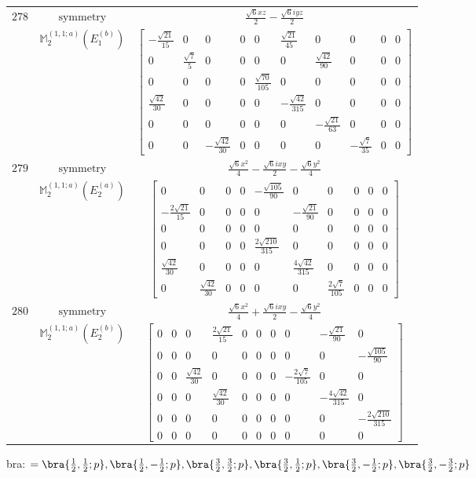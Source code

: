 \documentclass[fleqn,8pt,landscape]{jsarticle}
\begin{document}
\begin{longtable}{ccc}
$ 278 $ & $ \text{symmetry} $ & $ \frac{\sqrt{6} x z}{2} - \frac{\sqrt{6} i y z}{2} $ \\
$  $ & $ \mathbb{M}_{2}^{(1,1;a)}(E_{1}^{(b)}) $ & $ \begin{bmatrix} - \frac{\sqrt{21}}{15} & 0 & 0 & 0 & 0 & \frac{\sqrt{21}}{45} & 0 & 0 & 0 & 0 \\ 0 & \frac{\sqrt{7}}{5} & 0 & 0 & 0 & 0 & \frac{\sqrt{42}}{90} & 0 & 0 & 0 \\ 0 & 0 & 0 & 0 & \frac{\sqrt{70}}{105} & 0 & 0 & 0 & 0 & 0 \\ \frac{\sqrt{42}}{30} & 0 & 0 & 0 & 0 & - \frac{\sqrt{42}}{315} & 0 & 0 & 0 & 0 \\ 0 & 0 & 0 & 0 & 0 & 0 & - \frac{\sqrt{21}}{63} & 0 & 0 & 0 \\ 0 & 0 & - \frac{\sqrt{42}}{30} & 0 & 0 & 0 & 0 & - \frac{\sqrt{7}}{35} & 0 & 0 \end{bmatrix} $ \\ \hline
$ 279 $ & $ \text{symmetry} $ & $ \frac{\sqrt{6} x^{2}}{4} - \frac{\sqrt{6} i x y}{2} - \frac{\sqrt{6} y^{2}}{4} $ \\
$  $ & $ \mathbb{M}_{2}^{(1,1;a)}(E_{2}^{(a)}) $ & $ \begin{bmatrix} 0 & 0 & 0 & 0 & - \frac{\sqrt{105}}{90} & 0 & 0 & 0 & 0 & 0 \\ - \frac{2 \sqrt{21}}{15} & 0 & 0 & 0 & 0 & - \frac{\sqrt{21}}{90} & 0 & 0 & 0 & 0 \\ 0 & 0 & 0 & 0 & 0 & 0 & 0 & 0 & 0 & 0 \\ 0 & 0 & 0 & 0 & \frac{2 \sqrt{210}}{315} & 0 & 0 & 0 & 0 & 0 \\ \frac{\sqrt{42}}{30} & 0 & 0 & 0 & 0 & \frac{4 \sqrt{42}}{315} & 0 & 0 & 0 & 0 \\ 0 & \frac{\sqrt{42}}{30} & 0 & 0 & 0 & 0 & \frac{2 \sqrt{7}}{105} & 0 & 0 & 0 \end{bmatrix} $ \\ \hline
$ 280 $ & $ \text{symmetry} $ & $ \frac{\sqrt{6} x^{2}}{4} + \frac{\sqrt{6} i x y}{2} - \frac{\sqrt{6} y^{2}}{4} $ \\
$  $ & $ \mathbb{M}_{2}^{(1,1;a)}(E_{2}^{(b)}) $ & $ \begin{bmatrix} 0 & 0 & 0 & \frac{2 \sqrt{21}}{15} & 0 & 0 & 0 & 0 & - \frac{\sqrt{21}}{90} & 0 \\ 0 & 0 & 0 & 0 & 0 & 0 & 0 & 0 & 0 & - \frac{\sqrt{105}}{90} \\ 0 & 0 & \frac{\sqrt{42}}{30} & 0 & 0 & 0 & 0 & - \frac{2 \sqrt{7}}{105} & 0 & 0 \\ 0 & 0 & 0 & \frac{\sqrt{42}}{30} & 0 & 0 & 0 & 0 & - \frac{4 \sqrt{42}}{315} & 0 \\ 0 & 0 & 0 & 0 & 0 & 0 & 0 & 0 & 0 & - \frac{2 \sqrt{210}}{315} \\ 0 & 0 & 0 & 0 & 0 & 0 & 0 & 0 & 0 & 0 \end{bmatrix} $ \\ \hline
\end{longtable}
bra: $=\bra{\frac{1}{2},\frac{1}{2};p}, \bra{\frac{1}{2},- \frac{1}{2};p}, \bra{\frac{3}{2},\frac{3}{2};p}, \bra{\frac{3}{2},\frac{1}{2};p}, \bra{\frac{3}{2},- \frac{1}{2};p}, \bra{\frac{3}{2},- \frac{3}{2};p}$
\end{document}
